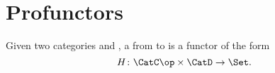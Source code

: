 

\section{Profunctors}

\begin{ctdefinition}[Profunctor]
    \label{def:profunctor}
    Given two categories \CatC and \CatD, a \emph{} from \CatC to \CatD is a functor of the form
    \begin{equation}
        H\colon \CatC\op \times \CatD \to \Set.
    \end{equation}
\end{ctdefinition}

